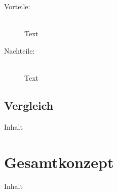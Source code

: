 \begin{description}
    \item[Vorteile:]\hfill \\
    Text
    
    \item[Nachteile:]\hfill \\
    Text

\end{description}

\subsection{Vergleich\label{subsec4.3.5:Unterunterpunkt-5}}

Inhalt

\section{Gesamtkonzept\label{sec4.4:Unterpunkt-4}}

Inhalt